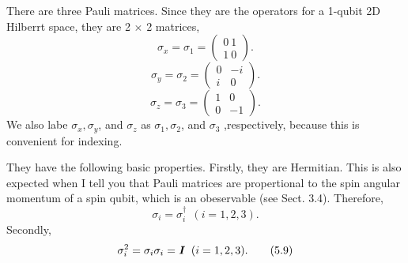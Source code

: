 \documentclass{article}
\newcommand{\bfit}[1]{\textit{\textbf{#1}}}
\begin{document}
There are three Pauli matrices. Since they are the operators for a 1-qubit 2D
Hilberrt space, they are 2 $\times$ 2 matrices,
\begin{equation} \label{eq 5.5}
    \sigma_x=\sigma_1=\begin{pmatrix}
        0\ 1\\ 1\ 0
    \end{pmatrix}. \tag{5.5}
\end{equation}
\begin{equation} \label{eq 5.6}
    \sigma_y=\sigma_2=\begin{pmatrix}
        0&-i\\ i & 0
    \end{pmatrix}. \tag{5.6}
\end{equation}
\begin{equation} \label{eq 5.7}
    \sigma_z=\sigma_3=\begin{pmatrix}
        1& 0\\ 0& -1
    \end{pmatrix}. \tag{5.7}
\end{equation}
We also labe $\sigma_x, \sigma_y$, and $\sigma_z$ as $\sigma_1, \sigma_2$, and $\sigma_3$
,respectively, because this is convenient for indexing.

They have the following basic properties. Firstly, they are Hermitian. This is also
expected when I tell you that Pauli matrices are propertional to the spin angular
momentum of a spin qubit, which is an obeservable (see Sect. 3.4). Therefore,
\begin{equation} \label{eq 5.8}
    \sigma_i=\sigma_i^{\dagger} \ \  (i=1,2,3).\tag{5.8}
\end{equation}
Secondly,
\begin{equation} \label{eq 5.9}
    \sigma_i^2=\sigma_i\sigma_i=\bfit{I} \ \ (i=1,2,3). \tag{5.9}
\end{equation}
\end{document}
